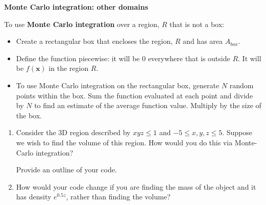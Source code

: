 \documentclass[12pt,letterpaper,noanswers]{exam}
\newcommand{\vc}[1]{\boldsymbol{#1}}
\begin{document}
\noindent\textbf{Monte Carlo integration: other domains}
\begin{tcolorbox}
To use \textbf{Monte Carlo integration} over a region, $R$ that is not a box:
\begin{itemize}
\itemsep0em
    \item Create a rectangular box that encloses the region, $R$ and has area $A_{box}$. 
    \item Define the function piecewise: it will be $0$ everywhere that is outside $R$.  It will be $f(\vc{x})$ in the region $R$.
    \item To use Monte Carlo integration on the rectangular box, generate $N$ random points within the box.  Sum the function evaluated at each point and divide by $N$ to find an estimate of the average function value.  Multiply by the size of the box.

\end{itemize}

\end{tcolorbox}

    

\begin{enumerate}[resume]
\item Consider the 3D region described by $xyz\leq 1$ and $-5\leq x,y,z\leq 5$.  Suppose we wish to find the volume of this region.  How would you do this via Monte-Carlo integration?  

Provide an outline of your code.

\item How would your code change if you are finding the mass of the object and it has density $e^{0.5z}$, rather than finding the volume?
\end{enumerate}
    


\end{document}
